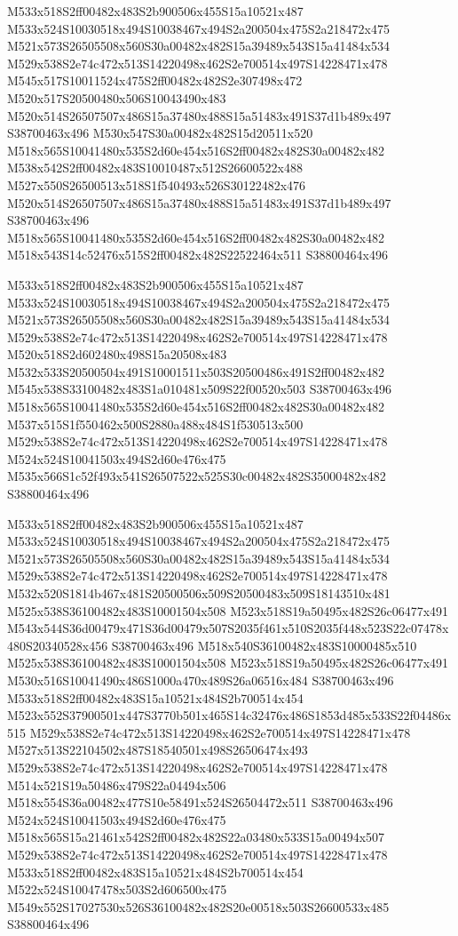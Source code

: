 \documentclass{article}
\begin{document}
\begin{multicols}{2}
M533x518S2ff00482x483S2b900506x455S15a10521x487 M533x524S10030518x494S10038467x494S2a200504x475S2a218472x475 M521x573S26505508x560S30a00482x482S15a39489x543S15a41484x534 M529x538S2e74c472x513S14220498x462S2e700514x497S14228471x478 M545x517S10011524x475S2ff00482x482S2e307498x472 M520x517S20500480x506S10043490x483 M520x514S26507507x486S15a37480x488S15a51483x491S37d1b489x497 S38700463x496 M530x547S30a00482x482S15d20511x520 M518x565S10041480x535S2d60e454x516S2ff00482x482S30a00482x482 M538x542S2ff00482x483S10010487x512S26600522x488 M527x550S26500513x518S1f540493x526S30122482x476 M520x514S26507507x486S15a37480x488S15a51483x491S37d1b489x497 S38700463x496 M518x565S10041480x535S2d60e454x516S2ff00482x482S30a00482x482 M518x543S14c52476x515S2ff00482x482S22522464x511 S38800464x496

M533x518S2ff00482x483S2b900506x455S15a10521x487 M533x524S10030518x494S10038467x494S2a200504x475S2a218472x475 M521x573S26505508x560S30a00482x482S15a39489x543S15a41484x534 M529x538S2e74c472x513S14220498x462S2e700514x497S14228471x478 M520x518S2d602480x498S15a20508x483 M532x533S20500504x491S10001511x503S20500486x491S2ff00482x482 M545x538S33100482x483S1a010481x509S22f00520x503 S38700463x496 M518x565S10041480x535S2d60e454x516S2ff00482x482S30a00482x482 M537x515S1f550462x500S2880a488x484S1f530513x500 M529x538S2e74c472x513S14220498x462S2e700514x497S14228471x478 M524x524S10041503x494S2d60e476x475 M535x566S1c52f493x541S26507522x525S30c00482x482S35000482x482 S38800464x496

M533x518S2ff00482x483S2b900506x455S15a10521x487 M533x524S10030518x494S10038467x494S2a200504x475S2a218472x475 M521x573S26505508x560S30a00482x482S15a39489x543S15a41484x534 M529x538S2e74c472x513S14220498x462S2e700514x497S14228471x478 M532x520S1814b467x481S20500506x509S20500483x509S18143510x481 M525x538S36100482x483S10001504x508 M523x518S19a50495x482S26c06477x491 M543x544S36d00479x471S36d00479x507S2035f461x510S2035f448x523S22c07478x480S20340528x456 S38700463x496 M518x540S36100482x483S10000485x510 M525x538S36100482x483S10001504x508 M523x518S19a50495x482S26c06477x491 M530x516S10041490x486S1000a470x489S26a06516x484 S38700463x496 M533x518S2ff00482x483S15a10521x484S2b700514x454 M523x552S37900501x447S3770b501x465S14c32476x486S1853d485x533S22f04486x515 M529x538S2e74c472x513S14220498x462S2e700514x497S14228471x478 M527x513S22104502x487S18540501x498S26506474x493 M529x538S2e74c472x513S14220498x462S2e700514x497S14228471x478 M514x521S19a50486x479S22a04494x506 M518x554S36a00482x477S10e58491x524S26504472x511 S38700463x496 M524x524S10041503x494S2d60e476x475 M518x565S15a21461x542S2ff00482x482S22a03480x533S15a00494x507 M529x538S2e74c472x513S14220498x462S2e700514x497S14228471x478 M533x518S2ff00482x483S15a10521x484S2b700514x454 M522x524S10047478x503S2d606500x475 M549x552S17027530x526S36100482x482S20e00518x503S26600533x485 S38800464x496


\end{multicols}
\end{document}
